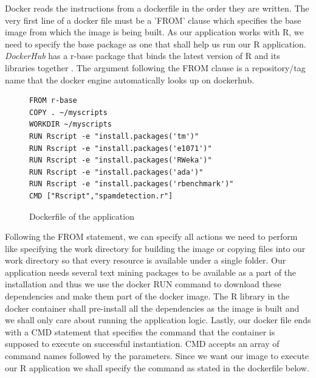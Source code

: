 \documentclass[9pt,twocolumn,twoside]{../../styles/osajnl}
\begin{document}
\noindent
Docker reads the instructions from a dockerfile in the order they are
written. The very first line of a docker file must be a 'FROM' clause
which specifies the base image from which the image is being built. As
our application works with R, we need to specify the base package as
one that shall help us run our R application. \emph{DockerHub}
\cite{www-dockerhub-libraries} has a r-base package that binds the
latest version of R and its libraries together
\cite{www-rbase-docker}. The argument following the FROM clause is a
repository/tag name that the docker engine automatically looks up on
dockerhub.

\begin{figure}[h]
\begin{verbatim}
FROM r-base
COPY . ~/myscripts
WORKDIR ~/myscripts
RUN Rscript -e "install.packages('tm')"
RUN Rscript -e "install.packages('e1071')"
RUN Rscript -e "install.packages('RWeka')"
RUN Rscript -e "install.packages('ada')"
RUN Rscript -e "install.packages('rbenchmark')"
CMD ["Rscript","spamdetection.r"]
\end{verbatim}
\caption{Dockerfile of the application}
\label{Dockerfile of the application}
\end{figure}

\noindent
Following the FROM statement, we can specify all actions we need to
perform like specifying the work directory for building the image or
copying files into our work directory so that every resource is
available under a single folder. Our application needs several text
mining packages to be available as a part of the installation and thus
we use the docker RUN command to download these dependencies and make
them part of the docker image. The R library in the docker container
shall pre-install all the dependencies as the image is built and we
shall only care about running the application logic. Lastly, our
docker file ends with a CMD statement that specifies the command that
the container is supposed to execute on successful instantiation. CMD
accepts an array of command names followed by the parameters. Since we
want our image to execute our R application we shall specify the
command as stated in the dockerfile below.
\end{document}
